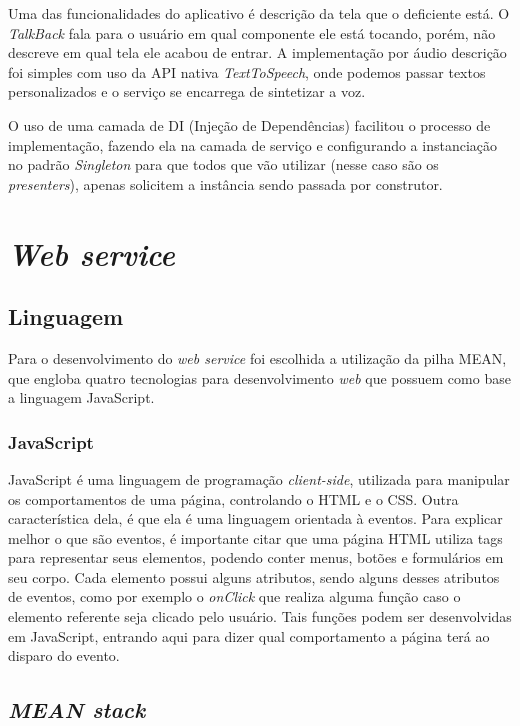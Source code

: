 \documentclass[
	12pt,				%
	oneside,			%
	a4paper,			%
	brazil				%
]{abntex2}
\begin{document}
Uma das funcionalidades do aplicativo é descrição da tela que o deficiente está. O \textit{TalkBack} fala para o usuário em qual componente ele está tocando, porém, não descreve em qual tela ele acabou de entrar. 
A implementação por áudio descrição foi simples com uso da API nativa \textit{TextToSpeech}, onde podemos passar textos personalizados e o serviço se encarrega de sintetizar a voz.

O uso de uma camada de DI (Injeção de Dependências) facilitou o processo de implementação, fazendo ela na camada de serviço e configurando a instanciação no padrão \textit{Singleton} para que todos que vão utilizar (nesse caso são os \textit{presenters}), apenas solicitem a instância sendo passada por construtor.

\section{\itshape Web service}

\subsection{Linguagem}

Para o desenvolvimento do \textit{web service} foi escolhida a utilização da pilha MEAN, que engloba quatro tecnologias para desenvolvimento \textit{web} que possuem como base a linguagem JavaScript.


\subsubsection{JavaScript}

JavaScript é uma linguagem de programação \textit{client-side}, utilizada para manipular os comportamentos de uma página, controlando o HTML e o CSS. Outra característica dela, é que ela é uma linguagem orientada à eventos.
Para explicar melhor o que são eventos, é importante citar que uma página HTML utiliza tags para representar seus elementos, podendo conter menus, botões e formulários em seu corpo. Cada elemento possui alguns atributos, sendo alguns desses atributos de eventos, como por exemplo o \textit{onClick} que realiza alguma função caso o elemento referente seja clicado pelo usuário.
Tais funções podem ser desenvolvidas em JavaScript, entrando aqui para dizer qual comportamento a página terá ao disparo do evento.\\

\subsection{\itshape MEAN stack}
\end{document}
